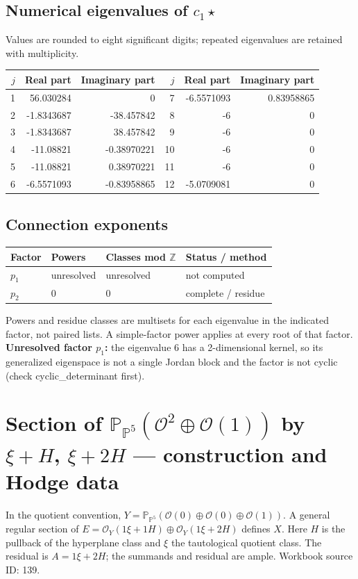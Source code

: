 \documentclass[10pt,a4paper]{article}
\begin{document}
\subsection*{Numerical eigenvalues of $c_1\star$}
Values are rounded to eight significant digits; repeated eigenvalues are retained with multiplicity.
\begin{center}\small\begin{tabular}{rrr@{\qquad}rrr}\toprule $j$ & Real part & Imaginary part & $j$ & Real part & Imaginary part\\\midrule
1 & 56.030284 & 0 & 7 & -6.5571093 & 0.83958865\\
2 & -1.8343687 & -38.457842 & 8 & -6 & 0\\
3 & -1.8343687 & 38.457842 & 9 & -6 & 0\\
4 & -11.08821 & -0.38970221 & 10 & -6 & 0\\
5 & -11.08821 & 0.38970221 & 11 & -6 & 0\\
6 & -6.5571093 & -0.83958865 & 12 & -5.0709081 & 0\\
\bottomrule\end{tabular}\end{center}
\subsection*{Connection exponents}
\begin{center}\begin{tabular}{llll}\toprule Factor & Powers & Classes mod $\mathbb Z$ & Status / method\\\midrule
$p_{1}$ & unresolved & unresolved & not computed\\
$p_{2}$ & $0$ & $0$ & complete / residue\\
\bottomrule\end{tabular}\end{center}
Powers and residue classes are multisets for each eigenvalue in the indicated factor, not paired lists. A simple-factor power applies at every root of that factor.
\textbf{Unresolved factor $p_{1}$:} the eigenvalue 6 has a 2-dimensional kernel, so its generalized eigenspace is not a single Jordan block and the factor is not cyclic (check cyclic\_determinant first).
\clearpage\section*{Section of $\mathbb P_{\mathbb P^{5}}(\mathcal O^{2}\oplus \mathcal O(1))$ by $\xi +H$, $\xi +2H$ --- construction and Hodge data}\label{entry:PB5-139}
In the quotient convention, $Y=\mathbb P_{\mathbb P^{5}}(\mathcal O(0)\oplus\mathcal O(0)\oplus\mathcal O(1))$.
A general regular section of $E=\mathcal O_Y(1\xi+1H)\oplus\mathcal O_Y(1\xi+2H)$ defines $X$.
Here $H$ is the pullback of the hyperplane class and $\xi$ the tautological quotient class. The residual is $A=1\xi+2H$; the summands and residual are ample.
Workbook source ID: 139.
\end{document}
